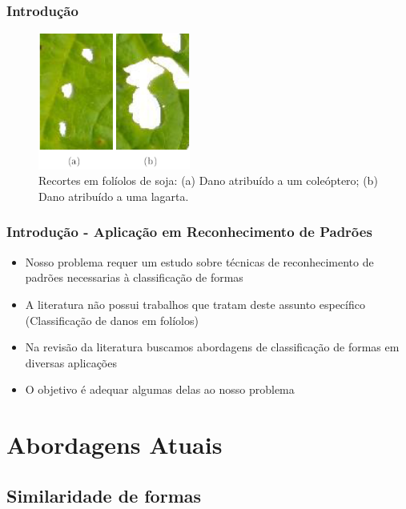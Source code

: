 \documentclass[brazil,a4paper,12pt]{beamer}%
\begin{document}
   \begin{frame}
    \frametitle{Introdução}

	\begin{figure}[h]
	  \begin{center}
	    \includegraphics[width = 5cm]{./imgs/folhas.png}
	  \end{center}
	  \caption{Recortes em folíolos de soja: (a) Dano atribuído a um coleóptero; (b) Dano atribuído a uma lagarta.}
	\end{figure}

   \end{frame}

   \begin{frame}
    \frametitle{Introdução - Aplicação em Reconhecimento de Padrões}
	\begin{itemize}
		\item{Nosso problema requer um estudo sobre técnicas de reconhecimento de padrões necessarias à classificação de formas}
		\item{A literatura não possui trabalhos que tratam deste assunto específico (Classificação de danos em folíolos)}
		\item{Na revisão da literatura buscamos abordagens de classificação de formas em diversas aplicações}
		\item{O objetivo é adequar algumas delas ao nosso problema}
	\end{itemize}
   \end{frame}

  \section{Abordagens Atuais}
   \subsection{Similaridade de formas}
    
\end{document}
